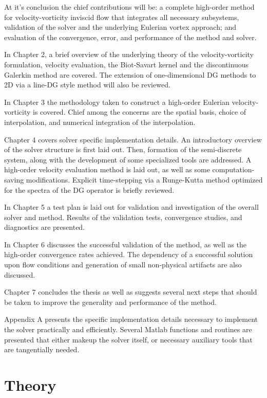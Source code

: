 \documentclass[letterpaper,12pt]{report}
\begin{document}
At it's conclusion the chief contributions will be: a complete high-order method for velocity-vorticity inviscid flow that integrates all necessary subsystems, validation of the solver and the underlying Eulerian vortex approach; and evaluation of the convergence, error, and performance of the method and solver.

In Chapter 2, a brief overview of the underlying theory of the velocity-vorticity formulation, velocity evaluation, the Biot-Savart  kernel and the discontinuous Galerkin method are covered. The extension of one-dimensional DG methods to 2D via a line-DG \cite{Persson2013} style method will also be reviewed. 

In Chapter 3 the methodology taken to construct a high-order Eulerian velocity-vorticity is covered. Chief among the concerns are the spatial basis, choice of interpolation, and numerical integration of the interpolation.

Chapter 4 covers solver specific implementation details. An introductory overview of the solver structure is first laid out. Then, formation of the semi-discrete system, along with the development of some specialized tools are addressed. A high-order velocity evaluation method is laid out, as well as some computation-saving modifications. Explicit time-stepping via a Runge-Kutta method optimized for the spectra of the DG operator is briefly reviewed.

In Chapter 5 a test plan is laid out for validation and investigation of the overall solver and method. Results of the validation tests, convergence studies, and diagnostics are presented.

In Chapter 6 discusses the successful validation of the method, as well as the high-order convergence rates achieved. The dependency of a successful solution upon flow conditions and generation of small non-physical artifacts are also discussed.

Chapter 7 concludes the thesis as well as suggests several next steps that should be taken to improve the generality and performance of the method.

Appendix A presents the specific implementation details necessary to implement the solver practically and efficiently. Several Matlab functions and routines are presented that either makeup the solver itself, or necessary auxiliary tools that are tangentially needed.

\chapter{Theory}
\end{document}
